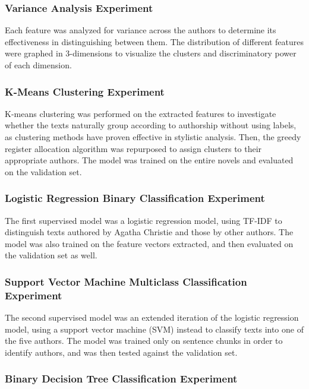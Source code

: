 \documentclass[journal]{IEEEtran} %
\begin{document}
\subsubsection{Variance Analysis Experiment}

Each feature was analyzed for variance across the authors to determine its effectiveness in distinguishing between them. The distribution of different features were graphed in 3-dimensions to visualize the clusters and discriminatory power of each dimension.

\subsubsection{K-Means Clustering Experiment}

K-means clustering was performed on the extracted features to investigate whether the texts naturally group according to authorship without using labels, as clustering methods have proven effective in stylistic analysis. \cite{roelleke} Then, the greedy register allocation algorithm was repurposed to assign clusters to their appropriate authors. The model was trained on the entire novels and evaluated on the validation set.

\subsubsection{Logistic Regression Binary Classification Experiment}

The first supervised model was a logistic regression model, using TF-IDF to distinguish texts authored by Agatha Christie and those by other authors.
The model was also trained on the feature vectors extracted, and then evaluated on the validation set as well.

\subsubsection{Support Vector Machine Multiclass Classification Experiment}

The second supervised model was an extended iteration of the logistic regression model, using a support vector machine (SVM) instead to classify texts into one of the five authors. The model was trained only on sentence chunks in order to identify authors, and was then tested against the validation set.

\subsubsection{Binary Decision Tree Classification Experiment}
\end{document}
